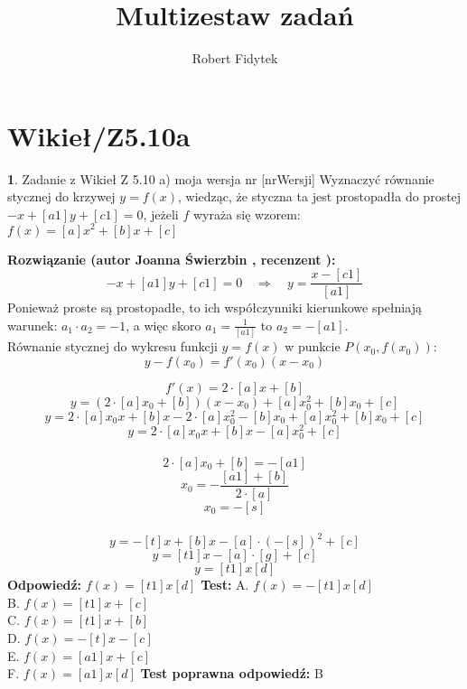 \documentclass[12pt, a4paper]{article}
\title{Multizestaw zadań}
\author{Robert Fidytek}
\date{}
\theoremstyle{definition} %
\newtheorem{zad}{}
\newcommand{\kategoria}[1]{\section{#1}} %
\newcommand{\zadStart}[1]{\begin{zad}#1\newline} %
\newcommand{\zadStop}{\end{zad}}   %
\newcommand{\rozwStart}[2]{\noindent \textbf{Rozwiązanie (autor #1 , recenzent #2): }\newline} %
\newcommand{\rozwStop}{\newline}                                            %
\newcommand{\odpStart}{\noindent \textbf{Odpowiedź:}\newline}    %
\newcommand{\odpStop}{\newline}                                             %
\newcommand{\testStart}{\noindent \textbf{Test:}\newline} %
\newcommand{\testStop}{\newline} %
\newcommand{\kluczStart}{\noindent \textbf{Test poprawna odpowiedź:}\newline} %
\newcommand{\kluczStop}{\newline} %
\begin{document}
\maketitle


\kategoria{Wikieł/Z5.10a}
\zadStart{Zadanie z Wikieł Z 5.10 a) moja wersja nr [nrWersji]}
Wyznaczyć równanie stycznej do krzywej $y=f(x)$, wiedząc, że styczna ta jest prostopadła do prostej $-x+[a1]y+[c1]=0$, jeżeli $f$ wyraża się wzorem:\\
$f(x)=[a]x^2+[b]x+[c] $
\zadStop
\rozwStart{Joanna Świerzbin}{}
$$
-x+[a1]y+[c1]=0 \quad \Rightarrow \quad y=\frac{x-[c1]}{[a1]}
$$
Ponieważ proste są prostopadłe, to ich współczynniki kierunkowe spełniają warunek: $ a_1 \cdot a_2 =-1$, a więc skoro $a_1 = \frac{1}{[a1]}$ to $ a_2= - [a1]$. \\
Równanie stycznej do wykresu funkcji $y=f(x)$ w punkcie $P(x_0,f(x_0))$:
$$
y-f(x_0)=f'(x_0)(x-x_0)
$$

$$f'(x)=2\cdot[a]x+[b]$$
$$ y = (2\cdot[a]x_0+[b])(x-x_0)+[a]x_0^2+[b]x_0+[c] $$
$$ y = 2\cdot[a]x_0x+[b]x-2\cdot[a]x_0^2-[b]x_0+[a]x_0^2+[b]x_0+[c] $$
$$ y = 2\cdot[a]x_0x+[b]x-[a]x_0^2+[c] $$ \\
$$ 2\cdot [a]x_0+[b] = - [a1] $$
$$ x_0 = - \frac{[a1] + [b]}{2\cdot[a]}$$
$$ x_0 = - [s]$$\\

$$ y = -[t]x+[b]x-[a]\cdot(-[s])^2+[c] $$
$$ y = [t1]x-[a]\cdot[g]+[c] $$
$$ y = [t1]x [d] $$
\rozwStop
\odpStart
$f(x)= [t1]x [d] $
\odpStop
\testStart
A. $f(x)=-[t1]x  [d]$\\
B. $f(x)=[t1]x + [c]$\\
C. $f(x)=[t1]x+[b]$\\
D. $f(x)=-[t]x - [c]$\\
E. $f(x)=[a1]x+ [c]$\\
F. $f(x)=[a1]x [d]$
\testStop
\kluczStart
B
\kluczStop
\end{document}
